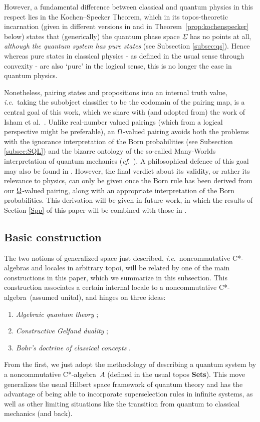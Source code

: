 \documentclass[11pt]{article}
\newcommand{\Sets}{\mbox{\textbf{Sets}}}
\newcommand{\ca}{C*-algebra} \newcommand{\jba}{JB-algebra}
\newcommand{\functor}[1]{\ensuremath{\underline{#1}}}
\newcommand{\ie}{\textit{i.e.}}
\newcommand{\ulS}{\functor{\Sigma}}
\begin{document}
However, a fundamental difference between classical and quantum physics in this
respect lies in the Kochen--Specker Theorem, which in its topos-theoretic
incarnation (given in different versions in \cite{butterfieldisham1} and in
Theorem~\ref{prop:kochenspecker} below)
states that (generically) the quantum phase space  $\ulS$ has no points at all,
{\it although the quantum system has pure states}
(see Subsection \ref{subsec:qs}). Hence whereas pure states in classical physics
- as defined in the usual sense through convexity  - are also  `pure' in the
logical sense, this is no longer the case in
quantum physics.

Nonetheless, pairing states and propositions into an internal truth value, \ie\
taking the subobject classifier to be the codomain of the pairing map,
is a central goal of this work, which we share with (and adopted from) the work
of Isham et al.\ \cite{butterfieldisham1,doringisham1}. Unlike real-number
valued pairings (which from a logical perspective might be preferable), an
$\Omega$-valued pairing
avoids both the problems with the ignorance interpretation of the Born
probabilities (see Subsection
\ref{subsec:SQL}) and the bizarre ontology of the so-called
Many-Worlds interpretation of quantum mechanics
(\textit{cf}.~\cite{Bub,ButVat}). A philosophical defence of this goal
may also be found in \cite{ButProc}. However, the final verdict about its
validity, or rather its relevance to physics, can only be given once
the Born rule has been derived from our  $\underline{\Omega}$-valued
pairing, along with an appropriate interpretation of the Born probabilities.
 This derivation will be given in future work, in which the
results of Section \ref{Spp} of this paper will be combined with those
in \cite{NPLBorn}.
\subsection{Basic construction}\label{sec:Bohr}
The two notions of generalized space just described, \ie\ noncommutative \ca s
and  locales in arbitrary topoi,
will be related by one of the main constructions in this paper, which we
 summarize in this subsection.
 This construction associates a certain  internal locale to a noncommutative
\ca\ (assumed unital), and hinges on three ideas:
\begin{enumerate}
\item {\it Algebraic quantum theory}
\cite{Emch,Haag:LQP,landsman98};
\item {\it Constructive Gelfand duality}
\cite{banaschewskimulvey00b,banaschewskimulvey00a,banaschewskimulvey06,
coquand05,CoquandSpitters:cstar};
\item {\it Bohr's doctrine of classical concepts}
\cite{bohr49,scheibe,landsman07}.
\end{enumerate}
From the first, we just adopt the methodology of describing a quantum system by
a
noncommutative \ca\ $A$ (defined in the usual topos \Sets). This move
generalizes the usual Hilbert space framework of quantum theory and has the
advantage of being able to incorporate superselection rules in infinite systems,
as well as other limiting situations like the transition from  quantum to
classical mechanics (and back).
\end{document}

